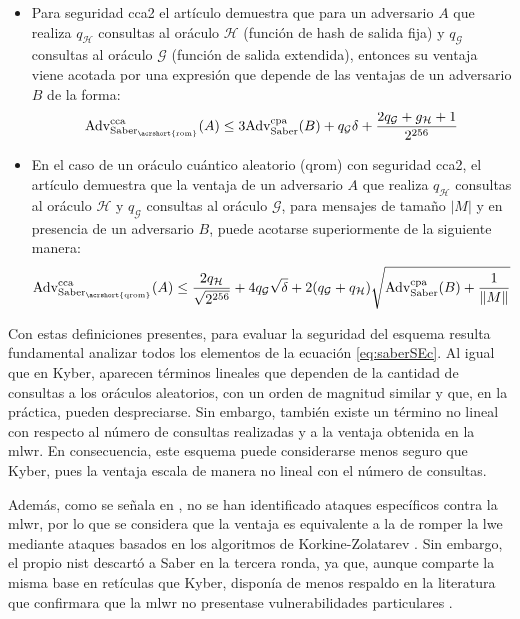 \begin{itemize}
	\item Para seguridad \acrshort{cca2} el artículo demuestra que para un adversario \(A\) que realiza \(q_{\mathcal{H}}\) consultas al oráculo \(\mathcal{H}\) (función de hash de salida fija) y \(q_{\mathcal{G}}\) consultas al oráculo \(\mathcal{G}\) (función de salida extendida), entonces su ventaja viene acotada por una expresión que depende de las ventajas de un adversario \(B\) de la forma:
	\begin{equation}
		\text{Adv}^{\text{cca}}_{\text{Saber}_{\text{\acrshort{rom}}}}(A)
		\le 3\text{Adv}^{\text{cpa}}_{\text{Saber}}(B)+ q_\mathcal{G}\delta+\dfrac{2q_\mathcal{G}+g_\mathcal{H}+1}{2^{256}}
	\end{equation}
	
	\item En el caso de un oráculo cuántico aleatorio (\acrshort{qrom}) con seguridad \acrshort{cca2}, el artículo demuestra que la ventaja de un adversario \(A\) que realiza \(q_{\mathcal{H}}\) consultas al oráculo \(\mathcal{H}\) y \(q_{\mathcal{G}}\) consultas al oráculo \(\mathcal{G}\), para mensajes de tamaño \(|M|\) y en presencia de un adversario \(B\), puede acotarse superiormente de la siguiente manera:
	\begin{equation}
		\text{Adv}^{\text{cca}}_{\text{Saber}_{\text{\acrshort{qrom}}}}(A)
		\le \dfrac{2q_\mathcal{H}}{\sqrt{2^{256}}} +4q_\mathcal{G}\sqrt{\delta}+2(q_\mathcal{G}+q_\mathcal{H})\sqrt{\text{Adv}^{\text{cpa}}_{\text{Saber}}(B)+ \dfrac{1}{\|M\|}}
		\label{eq:saberSEc}
	\end{equation}
\end{itemize}

Con estas definiciones presentes, para evaluar la seguridad del esquema resulta fundamental analizar todos los elementos de la ecuación \ref{eq:saberSEc}. Al igual que en Kyber, aparecen términos lineales que dependen de la cantidad de consultas a los oráculos aleatorios, con un orden de magnitud similar y que, en la práctica, pueden despreciarse. Sin embargo, también existe un término no lineal con respecto al número de consultas realizadas y a la ventaja obtenida en la \acrshort{mlwr}. En consecuencia, este esquema puede considerarse menos seguro que Kyber, pues la ventaja escala de manera no lineal con el número de consultas. 
\newline

Además, como se señala en \cite{modlwr}, no se han identificado ataques específicos contra la \acrshort{mlwr}, por lo que se considera que la ventaja es equivalente a la de romper la \acrshort{lwe} mediante ataques basados en los algoritmos de Korkine-Zolatarev \cite{SchnorrEuchner1994}. Sin embargo, el propio \acrshort{nist} descartó a Saber en la tercera ronda, ya que, aunque comparte la misma base en retículas que Kyber, disponía de menos respaldo en la literatura que confirmara que la \acrshort{mlwr} no presentase vulnerabilidades particulares \cite{nistPQCround3}.



